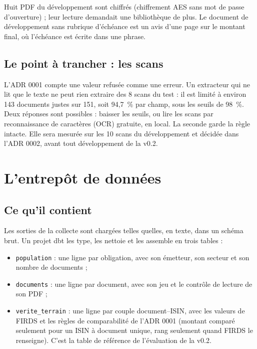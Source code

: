 \documentclass[11pt,a4paper]{article}
\begin{document}
Huit PDF du développement sont chiffrés (chiffrement AES sans mot de passe d'ouverture) ; leur lecture demandait une bibliothèque de plus. Le document de développement sans rubrique d'échéance est un avis d'une page sur le montant final, où l'échéance est écrite dans une phrase.

\subsection{Le point à trancher : les scans}

L'ADR 0001 compte une valeur refusée comme une erreur. Un extracteur qui ne lit que le texte ne peut rien extraire des 8 scans du test : il est limité à environ 143 documents justes sur 151, soit 94,7~\% par champ, sous les seuils de 98~\%. Deux réponses sont possibles : baisser les seuils, ou lire les scans par reconnaissance de caractères (OCR) gratuite, en local. La seconde garde la règle intacte. Elle sera mesurée sur les 10 scans du développement et décidée dans l'ADR 0002, avant tout développement de la v0.2.


\section{L'entrepôt de données}

\subsection{Ce qu'il contient}

Les sorties de la collecte sont chargées telles quelles, en texte, dans un schéma brut. Un projet dbt les type, les nettoie et les assemble en trois tables :

\begin{itemize}
  \item \texttt{population} : une ligne par obligation, avec son émetteur, son secteur et son nombre de documents ;
  \item \texttt{documents} : une ligne par document, avec son jeu et le contrôle de lecture de son PDF ;
  \item \texttt{verite\_terrain} : une ligne par couple document--ISIN, avec les valeurs de FIRDS et les règles de comparabilité de l'ADR 0001 (montant comparé seulement pour un ISIN à document unique, rang seulement quand FIRDS le renseigne). C'est la table de référence de l'évaluation de la v0.2.
\end{itemize}
\end{document}

